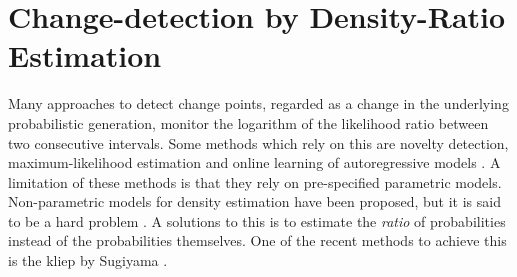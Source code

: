 \section{Change-detection by Density-Ratio Estimation}\label{density-ratio}









Many approaches to detect change points, regarded as a change in the underlying probabilistic generation, monitor the logarithm of the likelihood ratio between two consecutive intervals.
Some methods which rely on this are novelty detection, maximum-likelihood estimation and online learning of autoregressive models \cite{kawahara2009change}.
A limitation of these methods is that they rely on pre-specified parametric models.
Non-parametric models for density estimation have been proposed, but it is said to be a hard problem \cite{hardle2004nonparametric, sugiyama2012density}.
A solutions to this is to estimate the \emph{ratio} of probabilities instead of the probabilities themselves.
One of the recent methods to achieve this is the \gls{kliep} by Sugiyama \etal \cite{sugiyama2008direct}.

